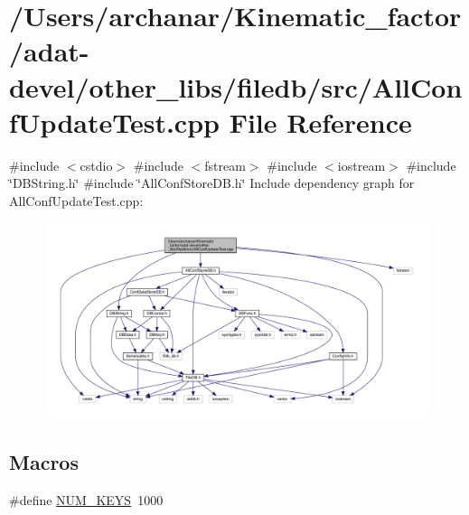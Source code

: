 \hypertarget{adat-devel_2other__libs_2filedb_2src_2AllConfUpdateTest_8cpp}{}\section{/\+Users/archanar/\+Kinematic\+\_\+factor/adat-\/devel/other\+\_\+libs/filedb/src/\+All\+Conf\+Update\+Test.cpp File Reference}
\label{adat-devel_2other__libs_2filedb_2src_2AllConfUpdateTest_8cpp}
{\ttfamily \#include $<$cstdio$>$}\newline
{\ttfamily \#include $<$fstream$>$}\newline
{\ttfamily \#include $<$iostream$>$}\newline
{\ttfamily \#include \char`\"{}D\+B\+String.\+h\char`\"{}}\newline
{\ttfamily \#include \char`\"{}All\+Conf\+Store\+D\+B.\+h\char`\"{}}\newline
Include dependency graph for All\+Conf\+Update\+Test.\+cpp\+:
\nopagebreak
\begin{figure}[H]
\begin{center}
\leavevmode
\includegraphics[width=350pt]{d3/d4d/adat-devel_2other__libs_2filedb_2src_2AllConfUpdateTest_8cpp__incl}
\end{center}
\end{figure}
\subsection*{Macros}
\begin{DoxyCompactItemize}
\item 
\#define \mbox{\hyperlink{adat-devel_2other__libs_2filedb_2src_2AllConfUpdateTest_8cpp_a9a8c7403a867e0c9543467ee8754050d}{N\+U\+M\+\_\+\+K\+E\+YS}}~1000
\end{DoxyCompactItemize}
